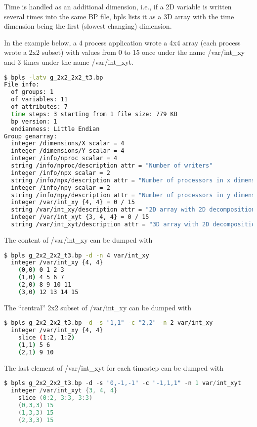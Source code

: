 Time is handled as an additional dimension, i.e., if a 2D variable is written several 
times into the same BP file, bpls lists it as a 3D array with the time dimension 
being the first (slowest changing) dimension. 

In the example below, a 4 process application wrote a 4x4 array (each process wrote 
a 2x2 subset) with values from 0 to 15 once under the name /var/int\_xy and 3 times 
under the name /var/int\_xyt. 

\begin{lstlisting}[language=bash,caption={bpls utility},label={}]
$ bpls -latv g_2x2_2x2_t3.bp 
File info:
  of groups: 1
  of variables: 11
  of attributes: 7
  time steps: 3 starting from 1 file size: 779 KB
  bp version: 1
  endianness: Little Endian
Group genarray:
  integer /dimensions/X scalar = 4
  integer /dimensions/Y scalar = 4
  integer /info/nproc scalar = 4
  string /info/nproc/description attr = "Number of writers"
  integer /info/npx scalar = 2
  string /info/npx/description attr = "Number of processors in x dimension"
  integer /info/npy scalar = 2
  string /info/npy/description attr = "Number of processors in y dimension"
  integer /var/int_xy {4, 4} = 0 / 15
  string /var/int_xy/description attr = "2D array with 2D decomposition"
  integer /var/int_xyt {3, 4, 4} = 0 / 15
  string /var/int_xyt/description attr = "3D array with 2D decomposition with time in 3rd dimension"
\end{lstlisting}

The content of /var/int\_xy can be dumped with
\begin{lstlisting}[language=bash,caption={},label={}]
$ bpls g_2x2_2x2_t3.bp -d -n 4 var/int_xy
  integer /var/int_xy {4, 4} 
    (0,0) 0 1 2 3
    (1,0) 4 5 6 7
    (2,0) 8 9 10 11
    (3,0) 12 13 14 15
\end{lstlisting}

The ``central'' 2x2 subset of /var/int\_xy can be dumped with
\begin{lstlisting}[language=bash,caption={},label={}]
$ bpls g_2x2_2x2_t3.bp -d -s "1,1" -c "2,2" -n 2 var/int_xy
  integer /var/int_xy {4, 4} 
    slice (1:2, 1:2)
    (1,1) 5 6
    (2,1) 9 10
\end{lstlisting}

The last element of /var/int\_xyt for each timestep can be dumped with
\begin{lstlisting}[language=C,caption={},label={}]
$ bpls g_2x2_2x2_t3.bp -d -s "0,-1,-1" -c "-1,1,1" -n 1 var/int_xyt
  integer /var/int_xyt {3, 4, 4} 
    slice (0:2, 3:3, 3:3)
    (0,3,3) 15
    (1,3,3) 15
    (2,3,3) 15
\end{lstlisting}

